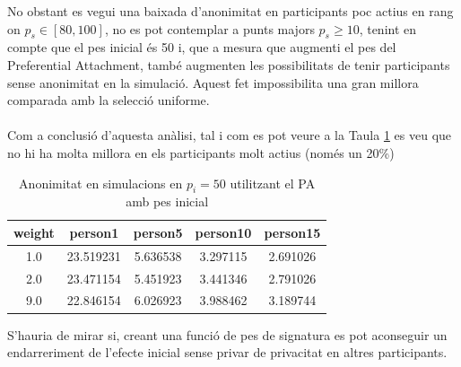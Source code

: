 \documentclass{article}
\begin{document}
No obstant es vegui una baixada d'anonimitat en participants poc actius en rang on $p_s \in [80, 100]$, no es pot contemplar a punts majors $p_s \ge 10$, tenint en compte que el pes inicial és 50 i, que a mesura que augmenti el pes del Preferential Attachment, també augmenten les possibilitats de tenir participants sense anonimitat en la simulació. Aquest fet impossibilita una gran millora comparada amb la selecció uniforme. 
\\
\\
Com a conclusió d'aquesta anàlisi, tal i com es pot veure a la Taula \ref{tab:an_pa} es veu que no hi ha molta millora en els participants molt actius (només un 20\%)
\begin{table}[H]
	\centering
	\begin{tabular}{c|cccc}
		weight & person1 & person5 & person10 & person15\\\hline
		1.0 & 23.519231 & 5.636538 & 3.297115 & 2.691026\\
		2.0 & 23.471154 &5.451923 &3.441346 &2.791026\\
		9.0 & 22.846154 & 6.026923 & 3.988462 &3.189744
	\end{tabular}
\caption{Anonimitat en simulacions en $p_i=50$ utilitzant el PA amb pes inicial}
\label{tab:an_pa}
\end{table}
S'hauria de mirar si, creant una funció de pes de signatura es pot aconseguir un endarreriment de l'efecte inicial sense privar de privacitat en altres participants.
\end{document}
